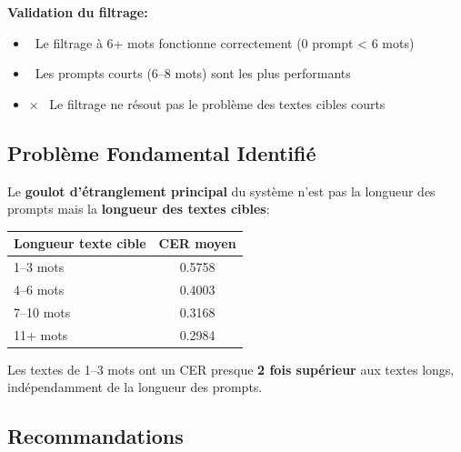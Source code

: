\documentclass[12pt,a4paper]{article}
\begin{document}
\textbf{Validation du filtrage:}
\begin{itemize}
    \item \checkmark \, Le filtrage à 6+ mots fonctionne correctement (0 prompt < 6 mots)
    \item \checkmark \, Les prompts courts (6--8 mots) sont les plus performants
    \item $\times$ \, Le filtrage ne résout pas le problème des textes cibles courts
\end{itemize}

\subsection{Problème Fondamental Identifié}

Le \textbf{goulot d'étranglement principal} du système n'est pas la longueur des prompts mais la \textbf{longueur des textes cibles}:

\begin{center}
\begin{tabular}{|l|c|}
\hline
\textbf{Longueur texte cible} & \textbf{CER moyen} \\
\hline
1--3 mots & 0.5758 \\
4--6 mots & 0.4003 \\
7--10 mots & 0.3168 \\
11+ mots & 0.2984 \\
\hline
\end{tabular}
\end{center}

Les textes de 1--3 mots ont un CER presque \textbf{2 fois supérieur} aux textes longs, indépendamment de la longueur des prompts.

\subsection{Recommandations}
\end{document}
